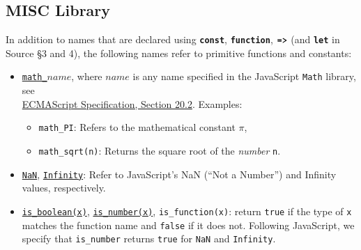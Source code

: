 \subsection*{MISC Library}


In addition to names that
are declared using \texttt{\textbf{const}}, \texttt{\textbf{function}},
$\texttt{\textbf{=>}}$ (and \texttt{\textbf{let}} in Source \S3 and 4), the following
names refer to primitive functions and constants:
\begin{itemize}
\item \href{https://source-academy.github.io/sicp/chapters/1.1.4.html\#p8}{\lstinline{math_}$\textit{name}$},
where $\textit{name}$ is any name specified in the
JavaScript
\texttt{Math} library, see\\
\href{https://www.ecma-international.org/ecma-262/9.0/index.html\#sec-math-object}{\color{DarkBlue}ECMAScript Specification, Section 20.2}. Examples:
\begin{itemize}
\item \verb#math_PI#: Refers to the mathematical constant $\pi$,
\item \verb#math_sqrt#\texttt{(n)}: Returns the square root of the \emph{number} \texttt{n}.
\end{itemize}
\item 
  \texttt{\href{https://www.ecma-international.org/ecma-262/9.0/index.html\#sec-value-properties-of-the-global-object-nan}{\color{DarkBlue}NaN}}, \texttt{\href{https://www.ecma-international.org/ecma-262/9.0/index.html\#sec-value-properties-of-the-global-object-infinity}{\color{DarkBlue}Infinity}}: Refer to JavaScript's 
NaN (``Not a Number'') and Infinity values, respectively.
\item \href{https://source-academy.github.io/sicp/chapters/4.1.2.html\#p2}{\lstinline{is_boolean(x)}}, \href{https://source-academy.github.io/sicp/chapters/2.3.2.html\#p5}{\lstinline{is_number(x)}},
  \verb#is_function#\texttt{(x)}:
        return \texttt{true} if the type of \texttt{x} matches the function name and \texttt{false} if it does not. Following
        JavaScript, we specify that \verb#is_number# returns \texttt{true} for \texttt{NaN} and \texttt{Infinity}.
\end{itemize}
